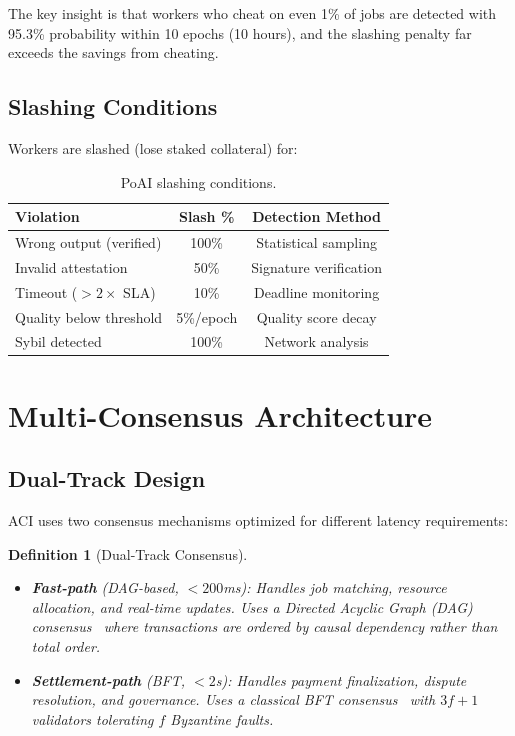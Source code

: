 \documentclass[11pt,twocolumn]{article}
\newtheorem{definition}{Definition}
\begin{document}
The key insight is that workers who cheat on even 1\% of jobs are detected with 95.3\% probability within 10 epochs (10 hours), and the slashing penalty far exceeds the savings from cheating.

\subsection{Slashing Conditions}

Workers are slashed (lose staked collateral) for:

\begin{table}[H]
\centering
\small
\begin{tabular}{lcc}
\toprule
\textbf{Violation} & \textbf{Slash \%} & \textbf{Detection Method} \\
\midrule
Wrong output (verified) & 100\% & Statistical sampling \\
Invalid attestation & 50\% & Signature verification \\
Timeout ($> 2\times$ SLA) & 10\% & Deadline monitoring \\
Quality below threshold & 5\%/epoch & Quality score decay \\
Sybil detected & 100\% & Network analysis \\
\bottomrule
\end{tabular}
\caption{PoAI slashing conditions.}
\label{tab:slashing}
\end{table}

\section{Multi-Consensus Architecture}
\label{sec:consensus}

\subsection{Dual-Track Design}

ACI uses two consensus mechanisms optimized for different latency requirements:

\begin{definition}[Dual-Track Consensus]
\begin{itemize}[leftmargin=1.1em]
    \item \textbf{Fast-path} (DAG-based, $< 200$ms): Handles job matching, resource allocation, and real-time updates. Uses a Directed Acyclic Graph (DAG) consensus~\cite{danezis2022narwhal} where transactions are ordered by causal dependency rather than total order.
    \item \textbf{Settlement-path} (BFT, $< 2$s): Handles payment finalization, dispute resolution, and governance. Uses a classical BFT consensus~\cite{yin2019hotstuff} with $3f+1$ validators tolerating $f$ Byzantine faults.
\end{itemize}
\end{definition}
\end{document}
